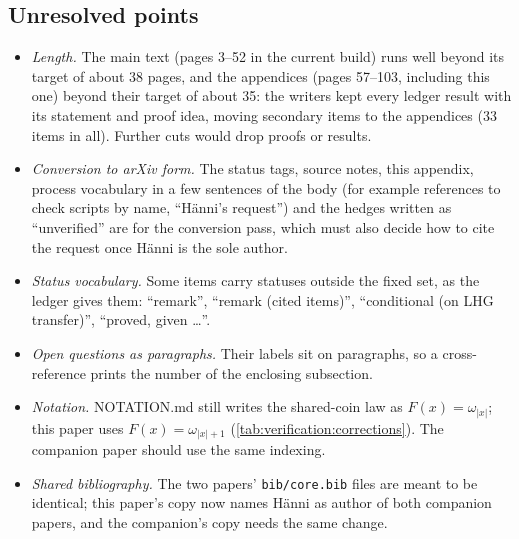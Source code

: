 \subsection{Unresolved points}\label{app:verification:unresolved}

\begin{itemize}[leftmargin=*]
\item \emph{Length.} The main text (pages 3--52 in the current build) runs well beyond its target of about 38 pages, and the appendices (pages 57--103, including this one) beyond their target of about 35: the writers kept every ledger result with its statement and proof idea, moving secondary items to the appendices (33 items in all). Further cuts would drop proofs or results.
\item \emph{Conversion to arXiv form.} The status tags, source notes, this appendix, process vocabulary in a few sentences of the body (for example references to check scripts by name, ``H\"anni's request'') and the hedges written as ``unverified'' are for the conversion pass, which must also decide how to cite the request \citep{hanni2026request} once H\"anni is the sole author.
\item \emph{Status vocabulary.} Some items carry statuses outside the fixed set, as the ledger gives them: ``remark'', ``remark (cited items)'', ``conditional (on LHG transfer)'', ``proved, given \ldots''.
\item \emph{Open questions as paragraphs.} Their labels sit on paragraphs, so a cross-reference prints the number of the enclosing subsection.
\item \emph{Notation.} NOTATION.md still writes the shared-coin law as $F(x)=\omega_{|x|}$; this paper uses $F(x)=\omega_{|x|+1}$ (\cref{tab:verification:corrections}). The companion paper should use the same indexing.
\item \emph{Shared bibliography.} The two papers' \texttt{bib/core.bib} files are meant to be identical; this paper's copy now names H\"anni as author of both companion papers, and the companion's copy needs the same change.
\end{itemize}
